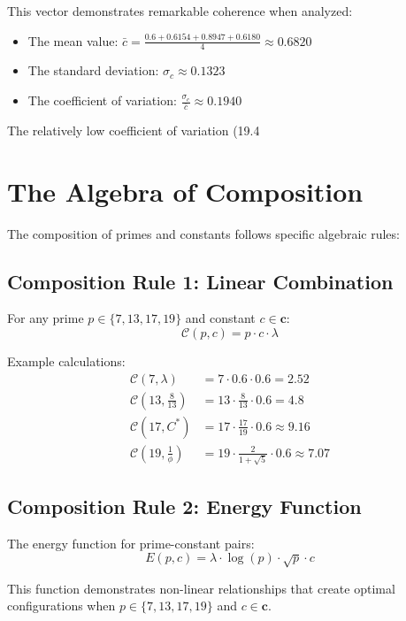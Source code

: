 \documentclass[12pt,a4paper]{report}
\newcommand{\Cstar}{C^*}
\newcommand{\base十三refined}{\frac{8}{13}}
\newcommand{\genprimes}{\{7, 13, 17, 19\}}
\begin{document}
This vector demonstrates remarkable coherence when analyzed:

\begin{itemize}
\item The mean value: $\bar{c} = \frac{0.6 + 0.6154 + 0.8947 + 0.6180}{4} \approx 0.6820$
\item The standard deviation: $\sigma_c \approx 0.1323$
\item The coefficient of variation: $\frac{\sigma_c}{\bar{c}} \approx 0.1940$
\end{itemize}

The relatively low coefficient of variation (19.4%

\section{The Algebra of Composition}

The composition of primes and constants follows specific algebraic rules:

\subsection{Composition Rule 1: Linear Combination}

For any prime $p \in \genprimes$ and constant $c \in \mathbf{c}$:
\[
\mathcal{C}(p, c) = p \cdot c \cdot \lambda
\]

Example calculations:
\begin{align*}
\mathcal{C}(7, \lambda) &= 7 \cdot 0.6 \cdot 0.6 = 2.52 \\
\mathcal{C}(13, \base十三refined) &= 13 \cdot \frac{8}{13} \cdot 0.6 = 4.8 \\
\mathcal{C}(17, \Cstar) &= 17 \cdot \frac{17}{19} \cdot 0.6 \approx 9.16 \\
\mathcal{C}(19, \frac{1}{\phi}) &= 19 \cdot \frac{2}{1+\sqrt{5}} \cdot 0.6 \approx 7.07
\end{align*}

\subsection{Composition Rule 2: Energy Function}

The energy function for prime-constant pairs:
\[
E(p, c) = \lambda \cdot \log(p) \cdot \sqrt{p} \cdot c
\]

This function demonstrates non-linear relationships that create optimal configurations when $p \in \genprimes$ and $c \in \mathbf{c}$.
\end{document}
